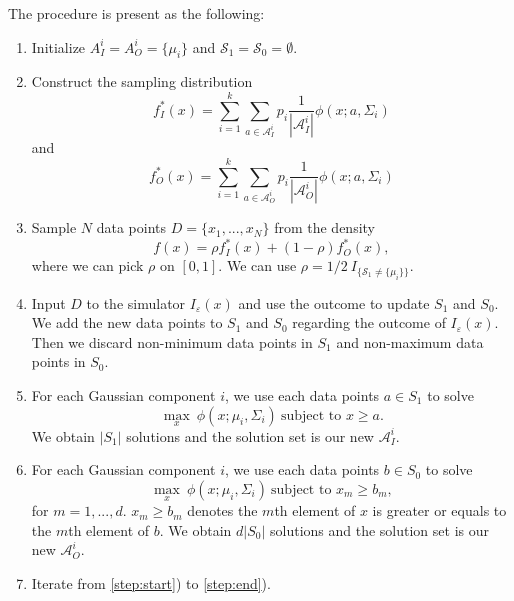 \documentclass[conference]{IEEEtran}
\begin{document}
The procedure is present as the following:
\begin{enumerate}
\item Initialize $A^i_I=A^i_O=\{\mu_i\}$ and $\mathcal{S}_1=\mathcal{S}_0=\emptyset$.
\item Construct the sampling distribution\begin{equation}
f^*_I(x)=\sum_{i=1}^{k} \sum_{a \in \mathcal{A}^i_I} p_i \frac{1}{|\mathcal{A}^i_I|} \phi(x;a,\Sigma_i)
\end{equation} and \begin{equation}
f^*_O(x)=\sum_{i=1}^{k} \sum_{a \in \mathcal{A}^i_O} p_i \frac{1}{|\mathcal{A}^i_O|} \phi(x;a,\Sigma_i)
\end{equation} \label{step:start}

\item Sample $N$ data points $D=\{x_1,...,x_N\}$ from the density \begin{equation}
f(x)=\rho f^*_I(x) +(1-\rho) f^*_O(x),
\end{equation}
where we can pick $\rho$ on $[0,1]$. We can use $\rho= 1/2 \ I_{\{\mathcal{S}_1 \neq \{\mu_i\}\}}.$

\item Input $D$ to the simulator $I_\varepsilon(x)$ and use the outcome to update $S_1$ and $S_0$. We add the new data points to $S_1$ and $S_0$ regarding the outcome of $I_\varepsilon(x)$. Then we discard non-minimum data points in $S_1$ and non-maximum data points in $S_0$.

\item For each Gaussian component $i$, we use each data points $a \in S_1$ to solve \begin{equation}
\max_x \ \phi(x;\mu_i,\Sigma_i)\ \text{subject to } x\geq a. \label{eq:opt_nominate_1}
\end{equation}
We obtain $|S_1|$ solutions and the solution set is our new $\mathcal{A}^i_I$.

\item For each Gaussian component $i$, we use each data points $b \in S_0$ to solve \begin{equation}
\max_x \ \phi(x;\mu_i,\Sigma_i)\ \text{subject to } x_m\geq b_m, \label{eq:opt_nominate_0}
\end{equation}
for $m=1,...,d$. $ x_m\geq b_m$ denotes the $m$th element of $x$ is greater or equals to the $m$th element of $b$.
We obtain $d|S_0|$ solutions and the solution set is our new $\mathcal{A}^i_O$. \label{step:end}

\item Iterate from \ref{step:start}) to \ref{step:end}).

\end{enumerate}
\end{document}
